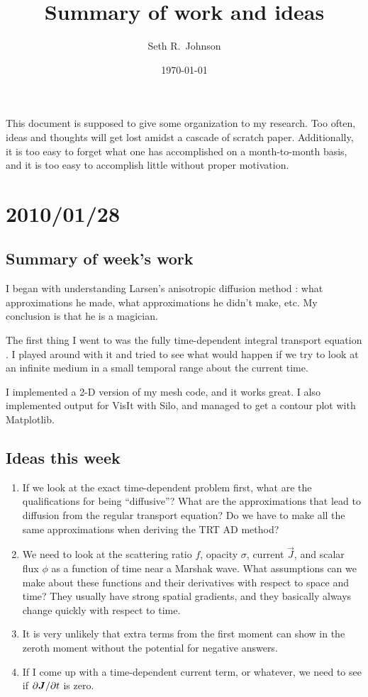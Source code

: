 \documentclass[11pt]{SRJresearch}
\author{Seth R.~Johnson}
\date{\today}
\title{Summary of work and ideas}
\begin{document}
This document is supposed to give some organization to my research. Too often,
ideas and thoughts will get lost amidst a cascade of scratch paper.
Additionally, it is too easy to forget what one has accomplished on a
month-to-month basis, and it is too easy to accomplish little without proper
motivation.


\section{2010/01/28}
\subsection{Summary of week's work}
I began with understanding Larsen's anisotropic diffusion method
\cite{Lar2009c}: what approximations he made, what approximations he didn't
make, etc. My conclusion is that he is a magician.

The first thing I went to was the fully time-dependent integral transport
equation \cite{Pri2010}. I played around with it and tried to see what would
happen if we try to look at an infinite medium in a small temporal range about
the current time. 

I implemented a 2-D version of my mesh code, and it works great. I also
implemented output for VisIt with Silo, and managed to get a contour plot with
Matplotlib.

\subsection{Ideas this week}
\begin{enumerate}
  \item 
If we look at the exact time-dependent problem first, what are the
qualifications for being ``diffusive''?  What are the approximations that lead
to diffusion from the regular transport equation?
Do we have to make all the same approximations when deriving the TRT AD method?

  \item 
We need to look at the scattering ratio $f$, opacity $\sigma$, current
$\vec{J}$, and scalar flux $\phi$ as a function of time near a Marshak wave.
What assumptions can we make about these functions and their derivatives with
respect to space and time? They usually have strong spatial gradients, and they
basically always change quickly with respect to time.

  \item 
It is very unlikely that extra terms from the first moment can show in the
zeroth moment without the potential for negative answers.

  \item 
If I come up with a time-dependent current term, or whatever, we need to see if
${\partial \bm{J}}/{\partial t}$ is zero.
\end{enumerate}
\end{document}
